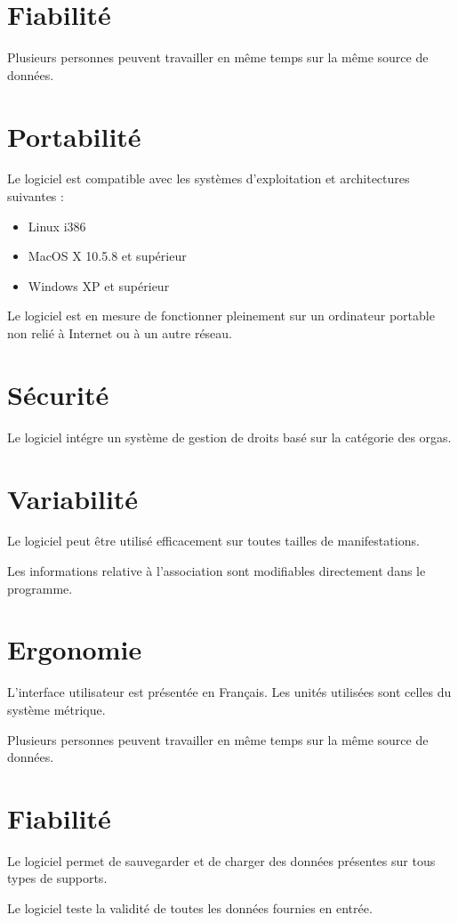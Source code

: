 \section{Fiabilité}
Plusieurs personnes peuvent travailler en même temps sur la même source de données.


\section{Portabilité}
Le logiciel est compatible avec les systèmes d'exploitation et architectures suivantes : 
\begin{itemize}
\item Linux i386
\item MacOS X 10.5.8 et supérieur
\item Windows XP et supérieur
\end{itemize}

Le logiciel est en mesure de fonctionner pleinement sur un ordinateur portable non relié à Internet ou à un autre réseau.

\section{Sécurité}
Le logiciel intégre un système de gestion de droits basé sur la catégorie des orgas.


\section{Variabilité}
Le logiciel peut être utilisé efficacement sur toutes tailles de manifestations.

Les informations relative à l'association sont modifiables directement dans le programme.

\section{Ergonomie}
L'interface utilisateur est présentée en Français. Les unités utilisées sont celles du système métrique. 

Plusieurs personnes peuvent travailler en même temps sur la même source de données.


\section{Fiabilité}
Le logiciel permet de sauvegarder et de charger des données présentes sur tous types de supports.

Le logiciel teste la validité de toutes les données fournies en entrée.
